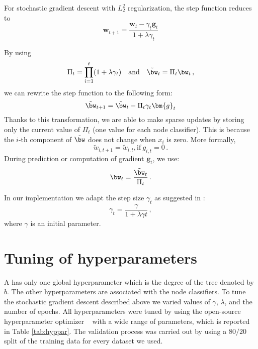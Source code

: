For stochastic gradient descent with $L_2^2$ regularization,
the step function reduces to
\begin{equation*}\label{eq:fobosl2}
	\bm{w}_{t+1} = \frac{\bm{w}_t - \gamma_t \bm{g}_t}{1 + \lambda\gamma_{t}}
\end{equation*}

By using  
$$
\Pi_t = \prod_{i=1}^t (1 + \lambda\gamma_{t}) 
\quad \mathrm{and} \quad \tilde{\bw}_t = \Pi_{t} \bw_t \,,
$$
we can rewrite the step function to the following form:
$$
\tilde{\bw}_{t+1}  = \tilde{\bw}_t - \Pi_{t}  \gamma_t \bm{g}_t
$$
Thanks to this transformation, we are able to make sparse updates by storing only the current value of $\Pi_t$ (one value for each node classifier). This is because the $i$-th component of $\tilde{\bw}$ does not change when $x_i$ is zero. More formally, 
$$
\tilde{w}_{i,t+1}  = \tilde{w}_{i,t} \mathrm{, if~} g_{i,t} = 0 \,.
$$
During prediction or computation of gradient $\bm{g}_t$, we use:
$$
\bw_t = \frac{\tilde{\bw}_{t}}{\Pi_{t}} \,.
$$

In our implementation we adapt the step size $\gamma_t$ as suggested in \citep{Bottou_2012}:
$$
\gamma_t = \frac{\gamma}{1 + \lambda \gamma t} \,,
$$
where $\gamma$ is an initial parameter.


\section{Tuning of hyperparameters}
\label{sec:hyper}


A  has only one global hyperparameter which is the degree of the tree denoted by $b$. The other hyperparameters are associated with the node classifiers. To tune the stochastic gradient descent described above we varied values of $\gamma$, $\lambda$, and the number of epochs. 
%
All hyperparameters were tuned by using the open-source hyperparameter optimizer ~\cite{Hutter_et_al_2011} with a wide range of parameters, which is reported in Table \ref{tab:hyppar}. 
The validation process was carried out by using a $80/20$ split of the training data for every dataset we used.


